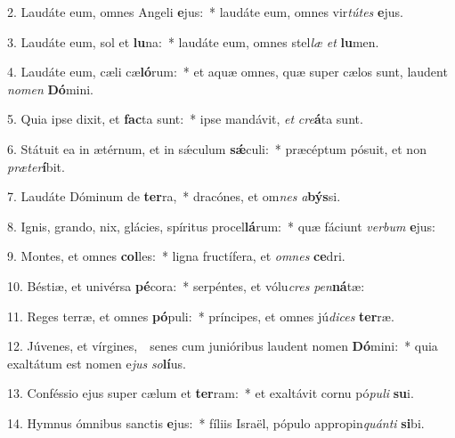 
2. Laudáte eum, omnes Angeli \textbf{e}jus:~* laudáte eum, omnes vir\textit{tú}\textit{tes} \textbf{e}jus.

3. Laudáte eum, sol et \textbf{lu}na:~* laudáte eum, omnes stel\textit{læ} \textit{et} \textbf{lu}men.

4. Laudáte eum, cæli cæ\textbf{ló}rum:~* et aquæ omnes, quæ super cælos sunt, laudent \textit{no}\textit{men} \textbf{Dó}mini.

5. Quia ipse dixit, et \textbf{fac}ta sunt:~* ipse mandávit, \textit{et} \textit{cre}\textbf{á}ta sunt.

6. Státuit ea in ætérnum, et in s\'{\ae}culum \textbf{s\'{\ae}}culi:~* præcéptum pósuit, et non \textit{præ}\textit{ter}\textbf{í}bit.

7. Laudáte Dóminum de \textbf{ter}ra,~* dracónes, et om\textit{nes} \textit{a}\textbf{býs}si.

8. Ignis, grando, nix, glácies, spíritus procel\textbf{lá}rum:~* quæ fáciunt \textit{ver}\textit{bum} \textbf{e}jus:

9. Montes, et omnes \textbf{col}les:~* ligna fructífera, et \textit{om}\textit{nes} \textbf{ce}dri.

10. Béstiæ, et univérsa \textbf{pé}cora:~* serpéntes, et vólu\textit{cres} \textit{pen}\textbf{ná}tæ:

11. Reges terræ, et omnes \textbf{pó}puli:~* príncipes, et omnes jú\textit{di}\textit{ces} \textbf{ter}ræ.

12. Júvenes, et vírgines,~\GreDagger\ senes cum junióribus laudent nomen \textbf{Dó}mini:~* quia exaltátum est nomen e\textit{jus} \textit{so}\textbf{lí}us.

13. Conféssio ejus super cælum et \textbf{ter}ram:~* et exaltávit cornu pó\textit{pu}\textit{li} \textbf{su}i.

14. Hymnus ómnibus sanctis \textbf{e}jus:~* fíliis Israël, pópulo appropin\textit{quán}\textit{ti} \textbf{si}bi.

